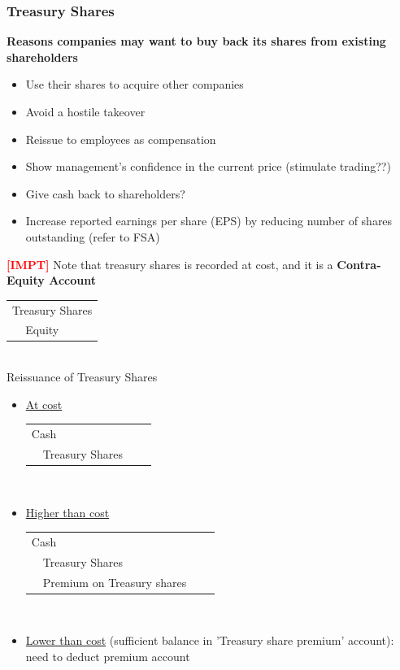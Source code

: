 \documentclass{article}
\newcommand{\impt}[0]{\textcolor{red}{\textbf{[IMPT] }}}
\begin{document}
\begin{multicols}{2}
\subsubsection{Treasury Shares}
\textbf{Reasons companies may want to buy back its shares from existing shareholders}
\begin{itemize}
	\item Use their shares to acquire other companies
	\item Avoid a hostile takeover
	\item Reissue to employees as compensation
	\item Show management's confidence in the current price (stimulate trading??)
	\item Give cash back to shareholders?
	\item Increase reported earnings per share (EPS) by reducing number of shares outstanding (refer to FSA)
\end{itemize}
\impt Note that treasury shares is recorded at cost, and it is a \textbf{Contra-Equity Account}
\begin{tabular}{llll}
	\multicolumn{4}{l}{Treasury Shares}\\
	& Equity& &\\
\end{tabular}\vspace{0.5em}\\
Reissuance of Treasury Shares
\begin{itemize}
	\item \underline{At cost}\vspace{0.5em}\\
	\begin{tabular}{llll}
		\multicolumn{4}{l}{Cash}\\
		& Treasury Shares& &\\
	\end{tabular}\vspace{0.5em}\\
	\item \underline{Higher than cost}\vspace{0.5em}\\
	\begin{tabular}{llll}
		\multicolumn{4}{l}{Cash}\\
		& Treasury Shares& &\\
		& Premium on Treasury shares & &
	\end{tabular}\vspace{0.5em}\\
	\item \underline{Lower than cost} (sufficient balance in 'Treasury share premium' account): need to deduct premium account \vspace{0.5em}\\

\end{itemize}
\end{multicols}
\end{document}
